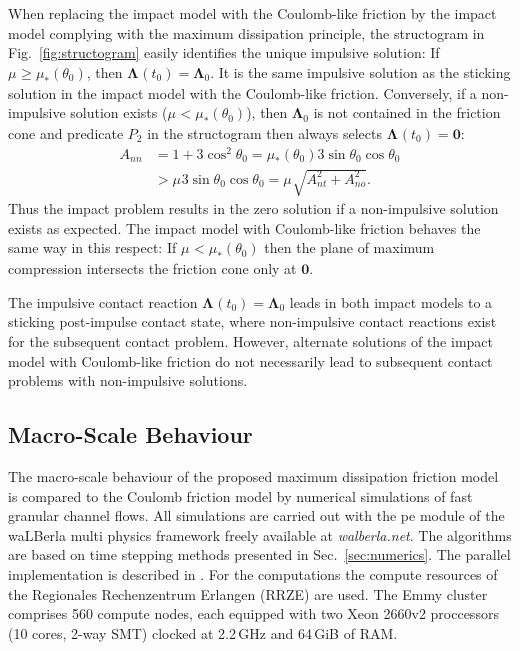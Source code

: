 \documentclass[global,twocolumn]{svjour}
\let\vec\bm
\newcommand{\cof}[1]{\ensuremath{\mu_{#1}}}
\newcommand{\contactimpulse}[1]{\ensuremath{\vec{\Lambda}_{#1}}}
\renewcommand{\figref}[1]{Fig.~\ref{#1}}
\begin{document}
	When replacing the impact model with the Coulomb-like friction by
	the impact model complying with the maximum dissipation principle,
	the structogram in \figref{fig:structogram} easily identifies the
	unique impulsive solution: If $\cof{} \geq \cof{*}(\theta_0)$, then
	$\contactimpulse{}(t_0) = \contactimpulse{0}$.
	It is the same impulsive solution as the sticking solution in
	the impact model with the Coulomb-like friction. Conversely, if
	a non-impulsive solution exists ($\cof{} < \cof{*}(\theta_0)$), then
	$\contactimpulse{0}$ is not contained in the friction cone and
	predicate $P_2$ in the structogram then always selects $\contactimpulse{}(t_0) = \vec 0$:
	\begin{equation*}
		\begin{split}
			A_{nn} & = 1 + 3 \cos^2 \theta_0 = \cof{*}(\theta_0) 3 \sin \theta_0 \cos \theta_0 \\
			       & > \cof{} 3 \sin \theta_0 \cos \theta_0 = \cof{} \sqrt{A_{nt}^2 + A_{no}^2}.
		\end{split}
	\end{equation*}
	Thus the impact problem results in the zero solution if a non-impulsive
	solution exists as expected. The impact model with Coulomb-like friction
	behaves the same way in this respect: If $\cof{} < \cof{*}(\theta_0)$ then the plane of
	maximum compression intersects the friction cone only at $\vec 0$.

	The impulsive contact reaction $\contactimpulse{}(t_0) = \contactimpulse{0}$
	leads in both impact models to a sticking post-impulse contact state,
	where non-impulsive contact reactions exist for the subsequent contact problem.
	However, alternate solutions of the impact model with Coulomb-like friction
	do not necessarily lead to subsequent contact problems with non-impulsive
	solutions.

	\subsection{Macro-Scale Behaviour}

	The macro-scale behaviour of the proposed maximum dissipation friction model is compared to the Coulomb friction model by numerical simulations of fast granular channel flows. All simulations are carried out with the pe module of the waLBerla multi physics framework freely available at \emph{walberla.net}. The algorithms are based on time stepping methods presented in Sec.~\ref{sec:numerics}. The parallel implementation is described in \cite{preclik14,preclik15}. For the computations the compute resources of the Regionales Rechenzentrum Erlangen (RRZE) are used. The Emmy cluster comprises 560 compute nodes, each equipped with two Xeon 2660v2 proccessors (10 cores, 2-way SMT) clocked at 2.2\,GHz and 64\,GiB of RAM.
\end{document}
